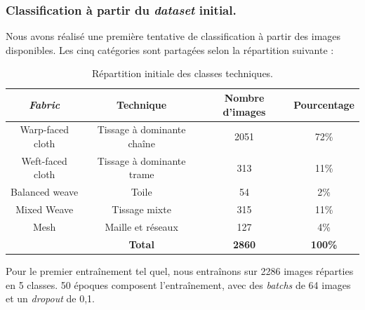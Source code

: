 \subsubsection{Classification à partir du \textit{dataset} initial.}
Nous avons réalisé une première tentative de classification à partir des images disponibles. Les cinq catégories sont partagées selon la répartition suivante :  
\begin{table}[!h]
    \centering
    \begin{tabular}{|c|c|c|c|}
        \hline
          \cellcolor{blue!20}\textbf{\textit{Fabric}} & \cellcolor{blue!20}\textbf{Technique} & \cellcolor{blue!20}\textbf{Nombre d'images}& \cellcolor{blue!20} \textbf{Pourcentage} \\ \hline \hline
         Warp-faced cloth & Tissage à dominante chaîne & 2051 & 72\% \\ \hline
         Weft-faced cloth & Tissage à dominante trame & 313 & 11\% \\ \hline
         Balanced weave & Toile & 54 & 2\% \\ \hline
         Mixed Weave & Tissage mixte & 315 &  11\% \\ \hline
         Mesh & Maille et réseaux & 127 &  4\%  \\ \hline
          & \textbf{Total} & \textbf{2860} &  \textbf{100\%}  \\ \hline
    \end{tabular}
    \caption{Répartition initiale des classes techniques.}
    \label{tab:classes_init}
\end{table}

Pour le premier entraînement tel quel, nous entraînons sur 2286 images réparties en 5 classes. 50 époques composent l'entraînement, avec des \textit{batchs} de 64 images et un \textit{dropout} de 0,1.

\vspace{4pt}
 

